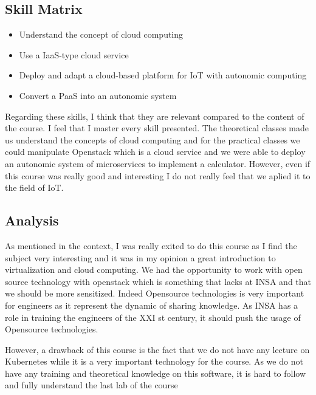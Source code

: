 \subsection{Skill Matrix}

\begin{itemize}
    \item Understand the concept of cloud computing 
    \item Use a IaaS-type cloud service
    \item Deploy and adapt a cloud-based platform for IoT with autonomic computing
    \item Convert a PaaS into an autonomic system 
\end{itemize}

Regarding these skills, I think that they are relevant compared to the content of the course. I feel that I master every skill presented. The theoretical classes made us understand the concepts of cloud computing and for the practical classes we could manipulate Openstack which is a cloud service and we were able to deploy an autonomic system of microservices to implement a calculator. However, even if this course was really good and interesting I do not really feel that we aplied it to the field of IoT.

\subsection{Analysis}

As mentioned in the context, I was really exited to do this course as I find the subject very interesting and it was in my opinion a great introduction to virtualization and cloud computing. We had the opportunity to work with open source technology with openstack which is something that lacks at INSA and that we should be more sensitized. Indeed Opensource technologies is very important for engineers as it represent the dynamic of sharing knowledge. As INSA has a role in training the engineers of the XXI st century, it should push the usage of Opensource technologies.
\smallskip

However, a drawback of this course is the fact that we do not have any lecture on Kubernetes while it is a very important technology for the course. As we do not have any training and theoretical knowledge on this software, it is hard to follow and fully understand the last lab of the course